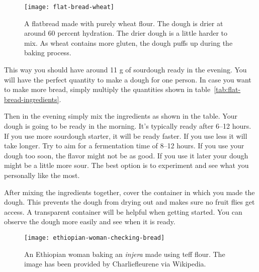 \begin{figure}[htb!]
  \texttt{[image: flat-bread-wheat]}
  \centering
  \caption{A flatbread made with purely wheat flour. The dough is drier
  at around 60 percent hydration. The drier dough is a little harder
  to mix. As wheat contains more gluten, the dough puffs up during
  the baking process.}
\end{figure}

This way you should have around 11 g of sourdough ready in the evening. You will have
the perfect quantity to make a dough for one person. In case you want to make more
bread, simply multiply the quantities shown in table~\ref*{tab:flat-bread-ingredients}.

Then in the evening simply mix the ingredients as shown in the table. Your dough
is going to be ready in the morning. It's typically ready after 6--12 hours. If
you use more sourdough starter, it will be ready faster. If you use less it will take
longer. Try to aim for a fermentation time of 8--12 hours. If you use
your dough too soon, the flavor might not be as good. If you use it later
your dough might be a little more sour. The best option is to experiment
and see what you personally like the most.

After mixing the ingredients together, cover the container in which
you made the dough. This prevents the dough from drying out and makes
sure no fruit flies get access. A transparent container will be helpful
when getting started. You can observe the dough more easily and see when
it is ready.

\begin{figure}[htb!]
  \texttt{[image: ethiopian-woman-checking-bread]}
  \centering
  \caption{An Ethiopian woman baking an \emph{injera} made using teff flour.
  The image has been provided by Charliefleurene via Wikipedia.}
\end{figure}

